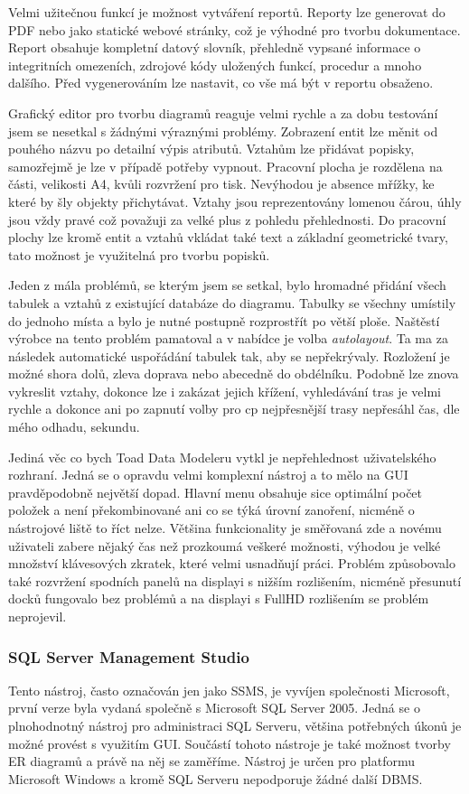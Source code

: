 \documentclass[czech,bachelor,public,dept460,male,oneside]{diploma}
\begin{document}
		Velmi užitečnou funkcí je možnost vytváření reportů. Reporty lze generovat do PDF nebo jako statické webové stránky, což je výhodné pro tvorbu dokumentace. Report obsahuje kompletní datový slovník, přehledně vypsané informace o integritních omezeních, zdrojové kódy uložených funkcí, procedur a mnoho dalšího. Před vygenerováním lze nastavit, co vše má být v reportu obsaženo.
		
		Grafický editor pro tvorbu diagramů reaguje velmi rychle a za dobu testování jsem se nesetkal s žádnými výraznými problémy. Zobrazení entit lze měnit od  pouhého názvu po detailní výpis atributů. Vztahům lze přidávat popisky, samozřejmě je lze v případě potřeby vypnout. Pracovní plocha je rozdělena na části, velikosti A4, kvůli rozvržení pro tisk. Nevýhodou je absence mřížky, ke které by šly objekty přichytávat. Vztahy jsou reprezentovány lomenou čárou, úhly jsou vždy pravé což považuji za velké plus z pohledu přehlednosti. Do pracovní plochy lze kromě entit a vztahů vkládat také text a základní geometrické tvary, tato možnost je využitelná pro tvorbu popisků.
		
		Jeden z mála problémů, se kterým jsem se setkal, bylo hromadné přidání všech tabulek a vztahů z existující databáze do diagramu. Tabulky se všechny umístily do jednoho místa a bylo je nutné postupně rozprostřít po větší ploše. Naštěstí výrobce na tento problém pamatoval a v nabídce je volba \textit{autolayout}. Ta ma za následek automatické uspořádání tabulek tak, aby se nepřekrývaly. Rozložení je možné shora dolů, zleva doprava nebo abecedně do obdélníku. Podobně lze znova vykreslit vztahy, dokonce lze i zakázat jejich křížení, vyhledávání tras je velmi rychle a dokonce ani po zapnutí volby pro cp nejpřesnější trasy nepřesáhl čas, dle mého odhadu, sekundu. 
		
		Jediná věc co bych Toad Data Modeleru vytkl je nepřehlednost uživatelského rozhraní. Jedná se o opravdu velmi komplexní nástroj a to mělo na GUI pravděpodobně největší dopad. Hlavní menu obsahuje sice optimální počet položek a není překombinované ani co se týká úrovní zanoření, nicméně o nástrojové liště to říct nelze. Většina funkcionality je směřovaná zde a novému uživateli zabere nějaký čas než prozkoumá veškeré možnosti, výhodou je velké množství klávesových zkratek, které velmi usnadňují práci. Problém způsobovalo také rozvržení spodních panelů na displayi s nižším rozlišením, nicméně přesunutí docků fungovalo bez problémů a na displayi s FullHD rozlišením se problém neprojevil.
		
		\subsubsection{SQL Server Management Studio}
		Tento nástroj, často označován jen jako SSMS, je vyvíjen společnosti Microsoft, první verze byla vydaná společně s Microsoft SQL Server 2005. Jedná se o plnohodnotný nástroj pro administraci SQL Serveru, většina potřebných úkonů je možné provést s využitím GUI. Součástí tohoto nástroje je také možnost tvorby ER diagramů a právě na něj se zaměříme. Nástroj je určen pro platformu Microsoft Windows a kromě SQL Serveru nepodporuje žádné další DBMS.
		
\end{document}
